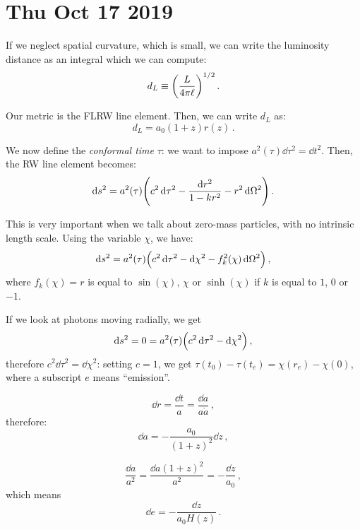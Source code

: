 \documentclass[main.tex]{subfiles}
\begin{document}
\section*{Thu Oct 17 2019}

If we neglect spatial curvature, which is small, we can write the luminosity distance as an integral which we can compute:
%
\begin{equation}
  d_L \equiv \qty(\frac{L}{4 \pi \ell})^{1/2}
\,.
\end{equation}
%

Our metric is the FLRW line element. Then, we can write \(d_L\) as: 
%
\begin{equation}
  d_L = a_0 (1+z) r(z)
\,.
\end{equation}
%

We now define the \emph{conformal time} \(\tau\): we want to impose \(a^2(\tau ) \dd{\tau^2} = \dd{t^2}  \).
Then, the RW line element becomes: 
%
\begin{equation}
  \dd{s^2} = a^2(\tau ) \qty(c^2 \dd{\tau^2} - \frac{\dd{r^2} }{1 - k r^2} - r^2 \dd{\Omega^2} )
\,.
\end{equation}

This is very important when we talk about zero-mass particles, with no intrinsic length scale.
Using the variable \(\chi\), we have: 
%
\begin{equation}
  \dd{s^2}  = a^2(\tau ) \qty(c^2 \dd{\tau^2} - \dd{\chi^2} - f^2_k (\chi ) \dd{\Omega^2})
\,,
\end{equation}
%
where \(f_k(\chi )=r\) is equal to \(\sin(\chi ) \), \(\chi \) or \(\sinh(\chi )\) if \(k\) is equal to \(1\), \(0\) or \(-1\).

If we look at photons moving radially, we get 
%
\begin{equation}
  \dd{s^2} = 0 = a^2(\tau ) \qty(c^2 \dd{\tau^2} - \dd{\chi^2})
\,,
\end{equation}
%
therefore \(c^2 \dd{\tau^2} = \dd{\chi^2}\): setting \(c=1\), we get \(\tau (t_0 ) - \tau (t_e) = \chi (r_e) - \chi (0)\), where a subscript \(e\) means ``emission''. 

\begin{equation}
  \dd{r} = \frac{\dd{t} }{a}  = \frac{\dd{a} }{a \dot{a} }
\,,
\end{equation}
%
therefore: 
%
\begin{equation}
  \dd{a} = - \frac{a_0 }{(1+z)^2} \dd{z}
\,,
\end{equation}
%

%
\begin{equation}
  \frac{\dd{a}}{a^2} = \frac{\dd{a} (1+z)^2}{a^2} = - \frac{\dd{z}}{ a_0 }
\,,
\end{equation}
%
which means 
%
\begin{equation}
  \dd{e} = - \frac{\dd{z}}{a_0 H(z)}
  \,.
\end{equation}
\end{document}
